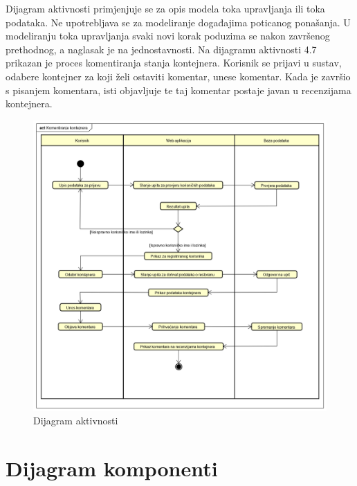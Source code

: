 			Dijagram  aktivnosti  primjenjuje  se  za  opis  modela  toka  upravljanja  ili  toka  podataka.   Ne upotrebljava se za modeliranje događajima poticanog ponašanja. U modeliranju toka upravljanja svaki novi korak poduzima se nakon završenog prethodnog, a naglasak je na jednostavnosti.  Na dijagramu aktivnosti 4.7 prikazan je proces komentiranja stanja kontejnera. Korisnik se prijavi u sustav, odabere kontejner za koji želi ostaviti komentar, unese komentar. Kada je završio s pisanjem komentara, isti objavljuje te taj komentar postaje javan u recenzijama kontejnera.
			
			\begin{figure}[H]
				\includegraphics[width=1.0\linewidth]{slike/dijagramAktivnosti.png}
				\centering
				\caption{Dijagram aktivnosti}
				\label{fig:dijagramAktivnosti}
			\end{figure}
			
			\eject
		\section{Dijagram komponenti}
		
